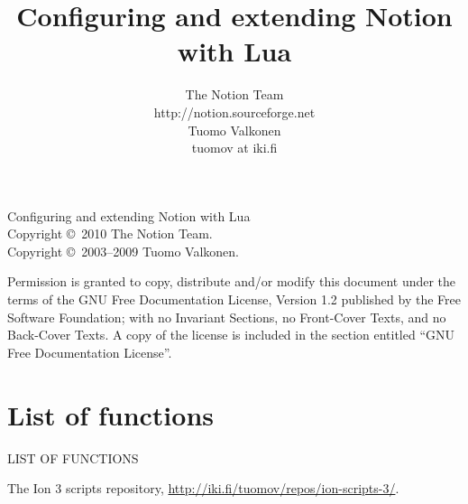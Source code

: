 \documentclass[english,a4paper,11pt,oldtoc,mctitle]{rapport3}
\title{Configuring and extending Notion with Lua}
\author{The Notion Team \\ http://notion.sourceforge.net \\ Tuomo Valkonen \\ tuomov at iki.fi}
\begin{document}
\maketitle

Configuring and extending Notion with Lua\\
Copyright \copyright\  2010 The Notion Team.\\
Copyright \copyright\  2003--2009 Tuomo Valkonen.

Permission is granted to copy, distribute and/or modify this document
under the terms of the GNU Free Documentation License, Version 1.2
published by the Free Software Foundation;
with no Invariant Sections, no Front-Cover Texts, and no Back-Cover Texts.
A copy of the license is included in the section entitled ``GNU
Free Documentation License''.

\tableofcontents













\appendix





\chapter*{List of functions}
%
         {\MakeUppercase{List of functions}}%

\makeatletter
\def\fnlisti#1{\@dottedtocline{1}{0em}{1.5em}{\lstinline!#1!}{\pageref{fn:#1}}}
{\parskip\z@}
\makeatother

\begin{htmlonly}
\newcommand{\fnlisti}[1]{\fnref{#1}\\}

\end{htmlonly}

\printindex

\begin{thebibliography}{9}
     The Ion 3 scripts repository,
        \url{http://iki.fi/tuomov/repos/ion-scripts-3/}.
\end{thebibliography}
\end{document}

